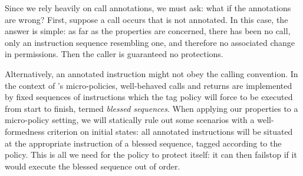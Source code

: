 \documentclass[acmsmall,review,anonymous]{acmart}\settopmatter{printfolios=true,printccs=false,printacmref=false}
\begin{document}

Since we rely heavily on call annotations, we must ask: what if the annotations
are wrong? First, suppose a call occurs that is not annotated.
In this case, the answer is simple: as far as the properties are concerned, there has
been no call, only an instruction sequence resembling one, and
therefore no associated change in permissions. Then the caller is guaranteed no
protections.

Alternatively, an annotated instruction might not obey the calling convention.
In the context of \citeauthor{DBLP:conf/sp/RoesslerD18}'s micro-policies, well-behaved calls
and returns are implemented by fixed sequences of instructions which the tag policy
will force to be executed from start to finish, termed {\em blessed sequences}.
When applying our properties to a micro-policy setting, we will statically rule out some
scenarios with a well-formedness criterion on initial states: all annotated instructions will
be situated at the appropriate instruction of a blessed sequence, tagged according to the policy.
This is all we need for the policy to protect itself: it can then failstop if it would
execute the blessed sequence out of order.

\end{document}
